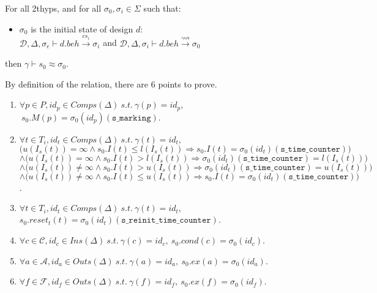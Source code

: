 \documentclass[dvipsnames,12pt]{article}
\begin{document}
\begin{lemma}
  \label{lem:sim-init-states}
  For all \hm2thyps{}, and for all $\sigma_0,\sigma_i\in{}\Sigma$ such that:
  \begin{itemize}
  \item $\sigma_0$ is the initial state of design $d$:\\
    $\mathcal{D},\Delta,\sigma_e\vdash{}d.beh\xrightarrow{cs_i}{}\sigma_i$ and
    $\mathcal{D},\Delta,\sigma_i\vdash{}d.beh\xrightarrow{\rightsquigarrow}{}\sigma_0$
  \end{itemize}
  then $\gamma\vdash{}s_0\approx\sigma_0$.
\end{lemma}

\begin{niproof}
  By definition of the  relation, there are 6
  points to prove.
  \begin{frameb}
    \begin{enumerate}
    \item\label{item:init-sim-mark} $\forall{}p\in{}P,id_p\in{}Comps(\Delta)~s.t.~\gamma(p)=id_p,$
      $~s_0.M(p)=\sigma_0(id_p)(\texttt{s\_marking})$.
    \item\label{item:init-sim-tc}
      $\forall{}t\in{}T_i,id_t\in{}Comps(\Delta)~s.t.~\gamma(t)=id_t,$\\
      $\big(u(I_s(t))=\infty\land{}s_0.I(t)\le{}l(I_s(t))\Rightarrow{}s_0.I(t)=\sigma_0(id_t)(\texttt{s\_time\_counter})\big)$\\
      $\land\big(u(I_s(t))=\infty\land{}s_0.I(t)>{}l(I_s(t))\Rightarrow{}\sigma_0(id_t)(\texttt{s\_time\_counter})=l(I_s(t))\big)$\\
      $\land\big(u(I_s(t))\neq\infty\land{}s_0.I(t)>{}u(I_s(t))\Rightarrow{}\sigma_0(id_t)(\texttt{s\_time\_counter})=u(I_s(t))\big)$\\
      $\land\big(u(I_s(t))\neq\infty\land{}s_0.I(t)\le{}u(I_s(t))\Rightarrow{}s_0.I(t)=\sigma_0(id_t)(\texttt{s\_time\_counter})\big)$.
    \item\label{item:init-sim-reset}
      $\forall{}t\in{}T_i,id_t\in{}Comps(\Delta)~s.t.~\gamma(t)=id_t,$
      $s_0.reset_t(t)=\sigma_0(id_t)(\texttt{s\_reinit\_time\_counter})$.
    \item\label{item:init-sim-cond}
      $\forall{}c\in\mathcal{C},id_c\in{}Ins(\Delta)~s.t.~\gamma(c)=id_c,~s_0.cond(c)=\sigma_0(id_c)$.
    \item\label{item:init-sim-act}
      $\forall{}a\in\mathcal{A},id_a\in{}Outs(\Delta)~s.t.~\gamma(a)=id_a,~s_0.ex(a)=\sigma_0(id_a)$.
    \item\label{item:init-sim-fun}
      $\forall{}f\in\mathcal{F},id_f\in{}Outs(\Delta)~s.t.~\gamma(f)=id_f,~s_0.ex(f)=\sigma_0(id_f)$.
    \end{enumerate}
  \end{frameb}


\end{niproof}
\end{document}
